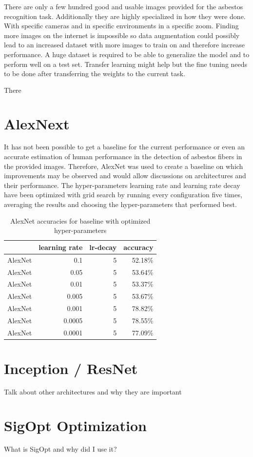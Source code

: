 There are only a few hundred good and usable images provided for the asbestos recognition task. Additionally they are highly specialized in how they were done. With specific cameras and in specific environments in a specific zoom. Finding more images on the internet is impossible so data augmentation could possibly lead to an increased dataset with more images to train on and therefore increase performance. A huge dataset is required to be able to generalize the model and to perform well on a test set. Transfer learning might help but the fine tuning needs to be done after transferring the weights to the current task.

There 

\section{AlexNext}

It has not been possible to get a baseline for the current performance or even an accurate estimation of human performance in the detection of asbestos fibers in the provided images. Therefore, AlexNet was used to create a baseline on which improvements may be observed and would allow discussions on architectures and their performance. The hyper-parameters learning rate and learning rate decay have been optimized with grid search by running every configuration five times, averaging the results and choosing the hyper-parameters that performed best.

\begin{table}[t] \centering
{}
\caption{AlexNet accuracies for baseline with optimized hyper-parameters}
\begin{tabular}{@{}rrrr@{}}
\toprule & learning rate & lr-decay & accuracy \\
\midrule
AlexNet		& 0.1 		& 5		& 52.18\%  \\
AlexNet		& 0.05 		& 5		& 53.64\%  \\
AlexNet		& 0.01 		& 5		& 53.37\%  \\
AlexNet		& 0.005 		& 5		& 53.67\%  \\
AlexNet		& 0.001 		& 5		& 78.82\%  \\
AlexNet		& 0.0005 		& 5		& 78.55\%  \\
AlexNet		& 0.0001 		& 5		& 77.09\%  \\
\bottomrule
\end{tabular}
\label{tbl:similarity-test-map}
\end{table}


\section{Inception / ResNet}

Talk about other architectures and why they are important

\section{SigOpt Optimization}

What is SigOpt and why did I use it?
